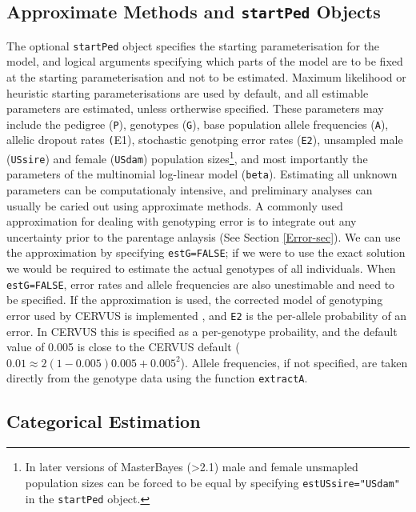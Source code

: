\documentclass{article}
\begin{document}
\subsection{Approximate Methods and \texttt{startPed} Objects}
\label{approx-sec}

The optional \texttt{startPed} object specifies the starting parameterisation for the model, and logical arguments specifying which parts of the model are to be fixed at the starting parameterisation and not to be estimated. Maximum likelihood or heuristic starting parameterisations are used by default, and all estimable parameters are estimated, unless ortherwise specified. These parameters may include the pedigree (\texttt{P}), genotypes (\texttt{G}), base population allele frequencies (\texttt{A}), allelic dropout rates \texttt(E1), stochastic genotping error rates (\texttt {E2}), unsampled male (\texttt{USsire}) and female (\texttt{USdam}) population sizes\footnote{In later versions of MasterBayes (>2.1) male and female unsmapled population sizes can be forced to be equal by specifying \texttt{estUSsire="USdam"} in the \texttt{startPed} object.}, and most importantly the parameters of the multinomial log-linear model (\texttt{beta}). Estimating all unknown parameters can be computationaly intensive, and preliminary analyses can usually be caried out using approximate methods.  A commonly used approximation for dealing with genotyping error is to integrate out any uncertainty prior to the parentage anlaysis (See Section \ref{Error-sec}).  We can use the approximation by specifying \texttt{estG=FALSE}; if we were to use the exact solution we would be required to estimate the actual genotypes of all individuals.  When \texttt{estG=FALSE}, error rates and allele frequencies are also unestimable and need to be specified.  If the approximation is used, the corrected model of genotyping error used by CERVUS is implemented \citep{Kalinowski.2006}, and \texttt{E2} is the per-allele probability of an error.  In CERVUS this is specified as a per-genotype probaility, and the default value of 0.005 is close to the CERVUS default ($0.01 \approx 2(1-0.005)0.005+0.005^{2}$).  Allele frequencies, if not specified, are taken directly from the genotype data using the function \texttt{extractA}.  


\subsection{Categorical Estimation}
\label{cat-sec}
\end{document}
